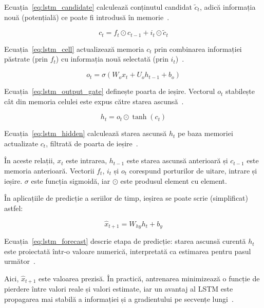 Ecuația~\ref{eq:lstm_candidate} calculează conținutul candidat $\tilde{c}_t$, adică informația nouă (potențială) ce poate fi introdusă în memorie~\cite{yu2019lstmreview, hochreiter1997lstm}.

\begin{equation}
c_t = f_t \odot c_{t-1} + i_t \odot \tilde{c}_t
\label{eq:lstm_cell}
\end{equation}

Ecuația~\ref{eq:lstm_cell} actualizează memoria $c_t$ prin combinarea informației păstrate (prin $f_t$) cu informația nouă selectată (prin $i_t$)~\cite{yu2019lstmreview, hochreiter1997lstm}.

\begin{equation}
o_t = \sigma(W_o x_t + U_o h_{t-1} + b_o)
\label{eq:lstm_output_gate}
\end{equation}

Ecuația~\ref{eq:lstm_output_gate} definește poarta de ieșire. Vectorul $o_t$ stabilește cât din memoria celulei este expus către starea ascunsă~\cite{yu2019lstmreview, hochreiter1997lstm}.

\begin{equation}
h_t = o_t \odot \tanh(c_t)
\label{eq:lstm_hidden}
\end{equation}

Ecuația~\ref{eq:lstm_hidden} calculează starea ascunsă $h_t$ pe baza memoriei actualizate $c_t$, filtrată de poarta de ieșire~\cite{yu2019lstmreview, hochreiter1997lstm}.

În aceste relații, $x_t$ este intrarea, $h_{t-1}$ este starea ascunsă anterioară și $c_{t-1}$ este memoria anterioară. Vectorii $f_t$, $i_t$ și $o_t$ corespund porturilor de uitare, intrare și ieșire. $\sigma$ este funcția sigmoidă, iar $\odot$ este produsul element cu element.

În aplicațiile de predicție a seriilor de timp, ieșirea se poate scrie (simplificat) astfel:

\begin{equation}
\hat{x}_{t+1} = W_{hy} h_t + b_y
\label{eq:lstm_forecast}
\end{equation}

Ecuația~\ref{eq:lstm_forecast} descrie etapa de predicție: starea ascunsă curentă $h_t$ este proiectată într-o valoare numerică, interpretată ca estimarea pentru pasul următor~\cite{yu2019lstmreview, hochreiter1997lstm}.

Aici, $\hat{x}_{t+1}$ este valoarea prezisă. În practică, antrenarea minimizează o funcție de pierdere între valori reale și valori estimate, iar un avantaj al LSTM este propagarea mai stabilă a informației și a gradientului pe secvențe lungi~\cite{yu2019lstmreview}.

